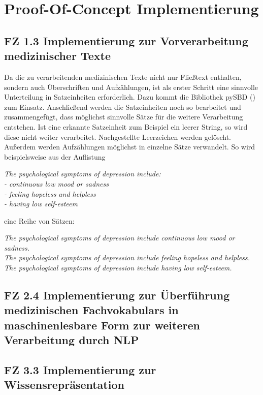 \chapter{Proof-Of-Concept Implementierung}
\label{ch:implementierung}


\section{FZ 1.3 Implementierung zur Vorverarbeitung medizinischer Texte}
\label{sec:FZ1.3} 

Da die zu verarbeitenden medizinischen Texte nicht nur Fließtext enthalten, sondern auch Überschriften und Aufzählungen, ist als erster Schritt eine sinnvolle Unterteilung in Satzeinheiten erforderlich. Dazu kommt die Bibliothek pySBD (\cite{sadvilkar_pysbd_2020}) zum Einsatz. Anschließend werden die Satzeinheiten noch so bearbeitet und zusammengefügt, dass möglichst sinnvolle Sätze für die weitere Verarbeitung entstehen. Ist eine erkannte Satzeinheit zum Beispiel ein leerer String, so wird diese nicht weiter verarbeitet. Nachgestellte Leerzeichen werden gelöscht. Außerdem werden Aufzählungen möglichst in einzelne Sätze verwandelt. So wird beispielsweise aus der Auflistung\\
\begin{addmargin}{10pt}
\emph{
	The psychological symptoms of depression include:\\
	- continuous low mood or sadness\\
	- feeling hopeless and helpless\\
	- having low self-esteem
}
\end{addmargin}
\vspace*{5mm}
eine Reihe von Sätzen:\\
\begin{addmargin}{10pt}
\emph{
	The psychological symptoms of depression include continuous low mood or sadness.\\
	The psychological symptoms of depression include feeling hopeless and helpless.\\
	The psychological symptoms of depression include having low self-esteem.
}
\end{addmargin}
\vspace*{5mm}
\section{FZ 2.4 Implementierung zur Überführung medizinischen Fachvokabulars in maschinenlesbare Form zur weiteren Verarbeitung durch NLP}
\label{sec:FZ2.4} 

\section{FZ 3.3 Implementierung zur Wissensrepräsentation}
\label{sec:FZ3.3} 

